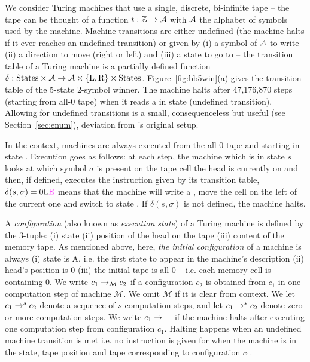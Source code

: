 We consider Turing machines that use a single, discrete, bi-infinite tape -- \ie the tape can be thought of a function $t: \mathbb{Z} \to \mathcal{A}$ with $\mathcal{A}$ the alphabet of symbols used by the machine. Machine transitions are either undefined (the machine halts if it ever reaches an undefined transition) or given by (i) a symbol of $\mathcal{A}$ to write (ii) a direction to move (right or left) and (iii) a state to go to -- \ie the transition table of a Turing machine is a partially defined function $\delta: \text{States} \times \mathcal{A} \to \mathcal{A} \times \{\text{L},\text{R}\} \times \text{States}$. Figure~\ref{fig:bb5win}(a) gives the transition table of the 5-state 2-symbol \BBfull winner. The machine halts after 47,176,870 steps (starting from all-0 tape) when it reads a \szero in state \stateE (undefined transition). Allowing for undefined transitions is a small, consequenceless but useful (see Section~\ref{sec:enum}), deviation from \rado's original setup.

In the \BBfull context, machines are always executed from the all-0 tape and starting in state \stateA. Execution goes as follows: at each step, the machine which is in state $s$ looks at which symbol $\sigma$ is present on the tape cell the head is currently on and then, if defined, executes the instruction given by its transition table, \eg $\delta(s, \sigma) = 0\text{L}\text{\stateE}$ means that the machine will write a \szero, move the cell on the left of the current one and switch to state \stateE. If $\delta(s, \sigma)$ is not defined, the machine halts.



A \textit{configuration} (also known as \textit{execution state}) of a Turing machine is defined by the 3-tuple: (i) state (ii) position of the head on the tape (iii) content of the memory tape. As mentioned above, here, \textit{the initial configuration} of a machine is always (i) state is A, i.e. the first state to appear in the machine's description (ii) head's position is 0 (iii) the initial tape is all-0 -- i.e. each memory cell is containing 0. We write $c_1 \to_\mathcal{M} c_2$ if a configuration $c_2$ is obtained from $c_1$ in one computation step of machine $\mathcal{M}$. We omit $\mathcal{M}$ if it is clear from context. We let $c_1 \to^s c_2$ denote a sequence of $s$ computation steps, and let $c_1 \to^* c_2$ denote zero or more computation steps. %
We write $c_1 \to \bot$ if the machine halts after executing one computation step from configuration $c_1$. Halting happens when an undefined machine transition is met i.e. no instruction is given for when the machine is in the state, tape position and tape corresponding to configuration $c_1$.

